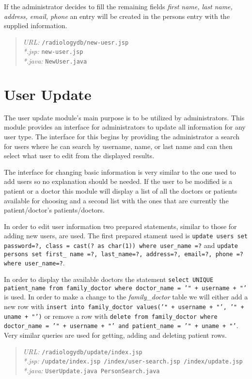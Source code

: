 \documentclass[12pt]{report}
\begin{document}
If the administrator decides to fill the remaining fields \emph{first name, last name, address, email, phone} an entry will be created in the persons entry with the supplied information.

\begin{quote}
\emph{URL:} \texttt{/radiologydb/new-uesr.jsp} \\
\emph{*.jsp: } \texttt{new-user.jsp} \\
\emph{*.java: } \texttt{NewUser.java}
\end{quote}

\section*{User Update}
The user update module's main purpose is to be utilized by administrators. This module provides an interface for administrators to update all information for any user type. The interface for this begins by providing the administrator a search for users where he can search by username, name, or last name and can then select what user to edit from the displayed results.

The interface for changing basic information is very similar to the one used to add users so no explanation should be needed. If the user to be modified is a patient or a doctor this module will display a list of all the doctors or patients available for choosing and a second list with the ones that are currently the patient/doctor's patients/doctors.

In order to edit user information two prepared statements, similar to those for adding new users, are used. The first prepared stament used is \texttt{update users set password=?, class = cast(? as char(1)) where user\_name =?} and \texttt{update persons set first\_ name =?, last\_name=?, address=?, email=?, phone =? where user\_name=?}.

In order to display the available doctors the statement \texttt{select UNIQUE patient\_name from family\_doctor where doctor\_name = '" + username + "'} is used. In order to make a change to the \emph{family\_doctor} table we will either add a new row with \texttt{insert into family\_doctor values('" + username + "', '" + uname + "')} or remove a row with \texttt{delete from family\_doctor where doctor\_name = '" + username + "' and patient\_name = '" + uname + "'}. Very similar queries are used for getting, adding and deleting patient rows.

\begin{quote}
\emph{URL:} \texttt{/radiologydb/update/index.jsp} \\
\emph{*.jsp: } \texttt{/update/index.jsp /index/user-search.jsp /index/update.jsp} \\
\emph{*.java: } \texttt{UserUpdate.java PersonSearch.java}
\end{quote}
\end{document}
